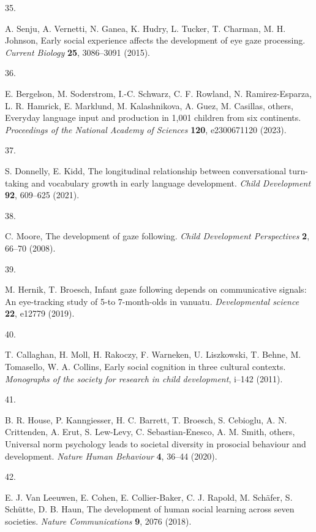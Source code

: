 \documentclass[
  man,floatsintext]{apa6}
\newlength{\cslhangindent}
\newlength{\csllabelwidth}
\newlength{\cslentryspacingunit} %
\newenvironment{CSLReferences}[2] %
 {%
  \setlength{\parindent}{0pt}
  \ifodd #1
  \let\oldpar\par
  \def\par{\hangindent=\cslhangindent\oldpar}
  \fi
  \setlength{\parskip}{#2\cslentryspacingunit}
 }%
 {}
\newcommand{\CSLLeftMargin}[1]{\parbox[t]{\csllabelwidth}{#1}}
\newcommand{\CSLRightInline}[1]{\parbox[t]{\linewidth - \csllabelwidth}{#1}\break}
\begin{document}
\begin{CSLReferences}{0}{0}
\leavevmode{}%
\CSLLeftMargin{35. }%
\CSLRightInline{A. Senju, A. Vernetti, N. Ganea, K. Hudry, L. Tucker, T. Charman, M. H. Johnson, Early social experience affects the development of eye gaze processing. \emph{Current Biology} \textbf{25}, 3086--3091 (2015).}

\leavevmode{}%
\CSLLeftMargin{36. }%
\CSLRightInline{E. Bergelson, M. Soderstrom, I.-C. Schwarz, C. F. Rowland, N. Ramirez-Esparza, L. R. Hamrick, E. Marklund, M. Kalashnikova, A. Guez, M. Casillas, others, Everyday language input and production in 1,001 children from six continents. \emph{Proceedings of the National Academy of Sciences} \textbf{120}, e2300671120 (2023).}

\leavevmode{}%
\CSLLeftMargin{37. }%
\CSLRightInline{S. Donnelly, E. Kidd, The longitudinal relationship between conversational turn-taking and vocabulary growth in early language development. \emph{Child Development} \textbf{92}, 609--625 (2021).}

\leavevmode{}%
\CSLLeftMargin{38. }%
\CSLRightInline{C. Moore, The development of gaze following. \emph{Child Development Perspectives} \textbf{2}, 66--70 (2008).}

\leavevmode{}%
\CSLLeftMargin{39. }%
\CSLRightInline{M. Hernik, T. Broesch, Infant gaze following depends on communicative signals: An eye-tracking study of 5-to 7-month-olds in vanuatu. \emph{Developmental science} \textbf{22}, e12779 (2019).}

\leavevmode{}%
\CSLLeftMargin{40. }%
\CSLRightInline{T. Callaghan, H. Moll, H. Rakoczy, F. Warneken, U. Liszkowski, T. Behne, M. Tomasello, W. A. Collins, Early social cognition in three cultural contexts. \emph{Monographs of the society for research in child development}, i--142 (2011).}

\leavevmode{}%
\CSLLeftMargin{41. }%
\CSLRightInline{B. R. House, P. Kanngiesser, H. C. Barrett, T. Broesch, S. Cebioglu, A. N. Crittenden, A. Erut, S. Lew-Levy, C. Sebastian-Enesco, A. M. Smith, others, Universal norm psychology leads to societal diversity in prosocial behaviour and development. \emph{Nature Human Behaviour} \textbf{4}, 36--44 (2020).}

\leavevmode{}%
\CSLLeftMargin{42. }%
\CSLRightInline{E. J. Van Leeuwen, E. Cohen, E. Collier-Baker, C. J. Rapold, M. Schäfer, S. Schütte, D. B. Haun, The development of human social learning across seven societies. \emph{Nature Communications} \textbf{9}, 2076 (2018).}


\end{CSLReferences}
\end{document}
